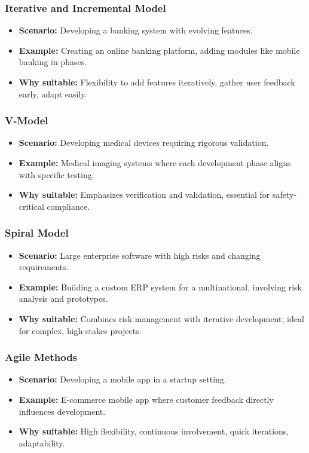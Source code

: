 \documentclass{beamer}
\begin{document}
\begin{frame}[fragile]
  \frametitle{Iterative and Incremental Model}
  \begin{itemize}
    \item \textbf{Scenario:} Developing a banking system with evolving features.
    \item \textbf{Example:} Creating an online banking platform, adding modules like mobile banking in phases.
    \item \textbf{Why suitable:} Flexibility to add features iteratively, gather user feedback early, adapt easily.
  \end{itemize}
\end{frame}

\begin{frame}[fragile]
  \frametitle{V-Model}
  \begin{itemize}
    \item \textbf{Scenario:} Developing medical devices requiring rigorous validation.
    \item \textbf{Example:} Medical imaging systems where each development phase aligns with specific testing.
    \item \textbf{Why suitable:} Emphasizes verification and validation, essential for safety-critical compliance.
  \end{itemize}
\end{frame}

\begin{frame}[fragile]
  \frametitle{Spiral Model}
  \begin{itemize}
    \item \textbf{Scenario:} Large enterprise software with high risks and changing requirements.
    \item \textbf{Example:} Building a custom ERP system for a multinational, involving risk analysis and prototypes.
    \item \textbf{Why suitable:} Combines risk management with iterative development; ideal for complex, high-stakes projects.
  \end{itemize}
\end{frame}

\begin{frame}[fragile]
  \frametitle{Agile Methods}
  \begin{itemize}
    \item \textbf{Scenario:} Developing a mobile app in a startup setting.
    \item \textbf{Example:} E-commerce mobile app where customer feedback directly influences development.
    \item \textbf{Why suitable:} High flexibility, continuous involvement, quick iterations, adaptability.
  \end{itemize}
\end{frame}
\end{document}
